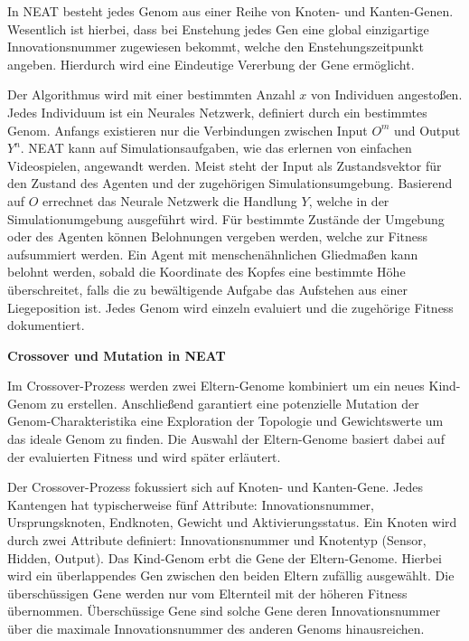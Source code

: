 In NEAT besteht jedes Genom aus einer Reihe von Knoten- und Kanten-Genen. Wesentlich ist hierbei, dass bei Enstehung jedes Gen eine global einzigartige Innovationsnummer zugewiesen bekommt, welche den Enstehungszeitpunkt angeben. Hierdurch wird eine Eindeutige Vererbung der Gene ermöglicht.

Der Algorithmus wird mit einer bestimmten Anzahl $x$ von Individuen angestoßen. Jedes Individuum ist ein Neurales Netzwerk, definiert durch ein bestimmtes Genom. Anfangs existieren nur die Verbindungen zwischen Input $O^m$ und Output $Y^n$. NEAT kann auf Simulationsaufgaben, wie das erlernen von einfachen Videospielen, angewandt werden. Meist steht der Input als Zustandsvektor für den Zustand des Agenten und der zugehörigen Simulationsumgebung. Basierend auf $O$ errechnet das Neurale Netzwerk die Handlung $Y$, welche in der Simulationumgebung ausgeführt wird. Für bestimmte Zustände der Umgebung oder des Agenten können Belohnungen vergeben werden, welche zur Fitness aufsummiert werden. Ein Agent mit menschenähnlichen Gliedmaßen kann belohnt werden, sobald die Koordinate des Kopfes eine bestimmte Höhe überschreitet, falls die zu bewältigende Aufgabe das Aufstehen aus einer Liegeposition ist. Jedes Genom wird einzeln evaluiert und die zugehörige Fitness dokumentiert.

\textbf{Crossover und Mutation in NEAT}

Im Crossover-Prozess werden zwei Eltern-Genome kombiniert um ein neues Kind-Genom zu erstellen. Anschließend garantiert eine potenzielle Mutation der Genom-Charakteristika eine Exploration der Topologie und Gewichtswerte um das ideale Genom zu finden. Die Auswahl der Eltern-Genome basiert dabei auf der evaluierten Fitness und wird später erläutert.

Der Crossover-Prozess fokussiert sich auf Knoten- und Kanten-Gene. Jedes Kantengen hat typischerweise fünf Attribute: Innovationsnummer, Ursprungsknoten, Endknoten, Gewicht und Aktivierungsstatus. Ein Knoten wird durch zwei Attribute definiert: Innovationsnummer und Knotentyp (Sensor, Hidden, Output). Das Kind-Genom erbt die Gene der Eltern-Genome. Hierbei wird ein überlappendes Gen zwischen den beiden Eltern zufällig ausgewählt. Die überschüssigen Gene werden nur vom Elternteil mit der höheren Fitness übernommen. 
Überschüssige Gene sind solche Gene deren Innovationsnummer über die maximale Innovationsnummer des anderen Genoms hinausreichen.

